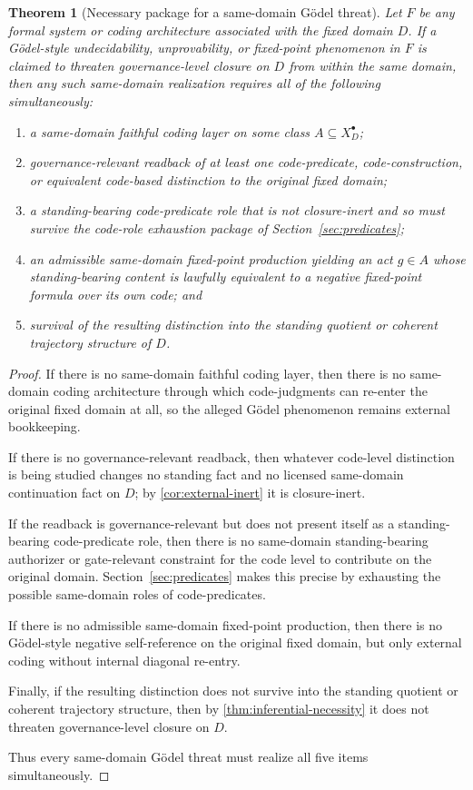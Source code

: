 \documentclass[11pt]{article}
\theoremstyle{plain}
\newtheorem{theorem}{Theorem}[section]
\theoremstyle{definition}
\newcommand{\Eval}{X_D^{\bullet}}
\newcommand{\domain}{D}
\begin{document}
\begin{theorem}[Necessary package for a same-domain G\"odel threat]
\label{thm:godel-prerequisites}
Let $F$ be any formal system or coding architecture associated with the fixed domain $\domain$. If a G\"odel-style undecidability, unprovability, or fixed-point phenomenon in $F$ is claimed to threaten governance-level closure on $\domain$ from within the same domain, then any such same-domain realization requires all of the following simultaneously:
\begin{enumerate}[label=(\roman*), leftmargin=2.5em]
    \item a same-domain faithful coding layer on some class $A\subseteq \Eval$;
    \item governance-relevant readback of at least one code-predicate, code-construction, or equivalent code-based distinction to the original fixed domain;
    \item a standing-bearing code-predicate role that is not closure-inert and so must survive the code-role exhaustion package of Section~\ref{sec:predicates};
    \item an admissible same-domain fixed-point production yielding an act $g\in A$ whose standing-bearing content is lawfully equivalent to a negative fixed-point formula over its own code; and
    \item survival of the resulting distinction into the standing quotient or coherent trajectory structure of $\domain$.
\end{enumerate}
\end{theorem}

\begin{proof}
If there is no same-domain faithful coding layer, then there is no same-domain coding architecture through which code-judgments can re-enter the original fixed domain at all, so the alleged G\"odel phenomenon remains external bookkeeping.

If there is no governance-relevant readback, then whatever code-level distinction is being studied changes no standing fact and no licensed same-domain continuation fact on $\domain$; by \cref{cor:external-inert} it is closure-inert.

If the readback is governance-relevant but does not present itself as a standing-bearing code-predicate role, then there is no same-domain standing-bearing authorizer or gate-relevant constraint for the code level to contribute on the original domain. Section~\ref{sec:predicates} makes this precise by exhausting the possible same-domain roles of code-predicates.

If there is no admissible same-domain fixed-point production, then there is no G\"odel-style negative self-reference on the original fixed domain, but only external coding without internal diagonal re-entry.

Finally, if the resulting distinction does not survive into the standing quotient or coherent trajectory structure, then by \cref{thm:inferential-necessity} it does not threaten governance-level closure on $\domain$.

Thus every same-domain G\"odel threat must realize all five items simultaneously.
\end{proof}
\end{document}
